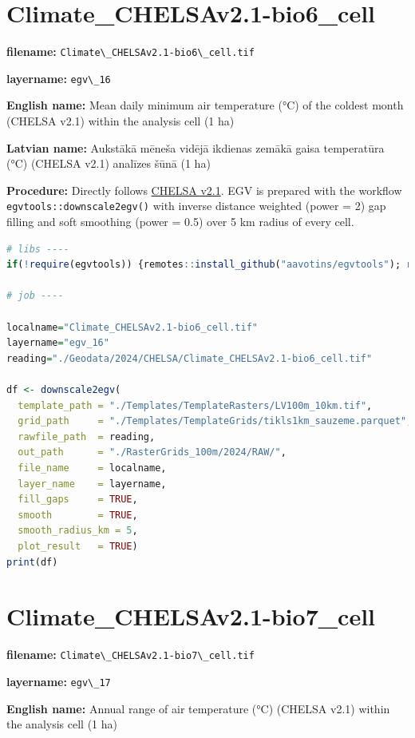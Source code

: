 \documentclass[
]{book}
\newcommand{\passthrough}[1]{#1}
\begin{document}
\section{Climate\_CHELSAv2.1-bio6\_cell}\label{ch06.016}

\textbf{filename:} \passthrough{\lstinline!Climate\_CHELSAv2.1-bio6\_cell.tif!}

\textbf{layername:} \passthrough{\lstinline!egv\_16!}

\textbf{English name:} Mean daily minimum air temperature (°C) of the coldest month (CHELSA v2.1) within the analysis cell (1 ha)

\textbf{Latvian name:} Aukstākā mēneša vidējā ikdienas zemākā gaisa temperatūra (°C) (CHELSA v2.1) analīzes šūnā (1 ha)

\textbf{Procedure:} Directly follows \hyperref[Ch04.11]{CHELSA v2.1}. EGV is prepared with the
workflow \passthrough{\lstinline!egvtools::downscale2egv()!} with inverse distance weighted (power = 2)
gap filling and soft smoothing (power = 0.5) over 5 km radius of every cell.

\begin{lstlisting}[language=R]
# libs ----
if(!require(egvtools)) {remotes::install_github("aavotins/egvtools"); require(egvtools)}

# job ----

localname="Climate_CHELSAv2.1-bio6_cell.tif"
layername="egv_16"
reading="./Geodata/2024/CHELSA/Climate_CHELSAv2.1-bio6_cell.tif"

df <- downscale2egv(
  template_path = "./Templates/TemplateRasters/LV100m_10km.tif",
  grid_path     = "./Templates/TemplateGrids/tikls1km_sauzeme.parquet",
  rawfile_path  = reading,
  out_path      = "./RasterGrids_100m/2024/RAW/",
  file_name     = localname,
  layer_name    = layername,
  fill_gaps     = TRUE,
  smooth        = TRUE,
  smooth_radius_km = 5,
  plot_result   = TRUE)
print(df)
\end{lstlisting}

\section{Climate\_CHELSAv2.1-bio7\_cell}\label{ch06.017}

\textbf{filename:} \passthrough{\lstinline!Climate\_CHELSAv2.1-bio7\_cell.tif!}

\textbf{layername:} \passthrough{\lstinline!egv\_17!}

\textbf{English name:} Annual range of air temperature (°C) (CHELSA v2.1) within the analysis cell (1 ha)
\end{document}
